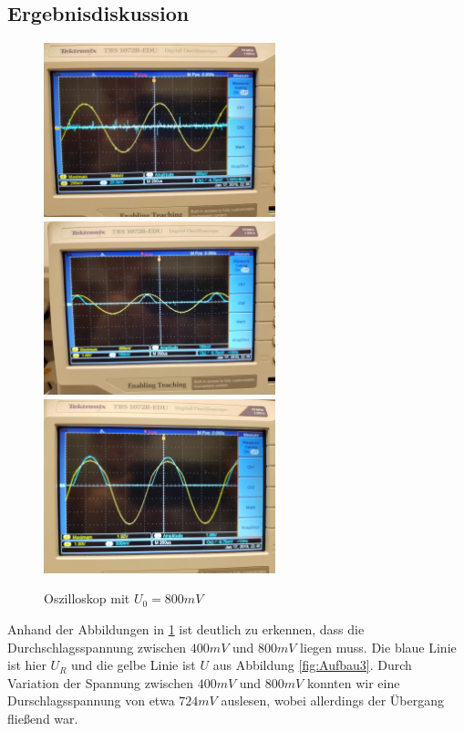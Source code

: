\documentclass{scrartcl}
\begin{document}
\subsection{Ergebnisdiskussion}
\begin{figure}[H]
  \centering
  	\includegraphics[width=0.6\textwidth]{3_400.jpg}
    \includegraphics[width=0.6\textwidth]{3_800.jpg}
    \includegraphics[width=0.6\textwidth]{3_2000.jpg}
  \caption{Oszilloskop mit $U_0 = 800mV$}
  \label{fig:800mv}
\end{figure}
Anhand der Abbildungen in \ref{fig:800mv} ist deutlich zu erkennen, dass die Durchschlagsspannung zwischen $400mV$ und $800mV$ liegen muss. Die blaue Linie ist hier $U_R$ und die gelbe Linie ist $U$ aus Abbildung \ref{fig:Aufbau3}. 
Durch Variation der Spannung zwischen $400mV$ und $800mV$ konnten wir eine Durschlagsspannung von etwa $724mV$ auslesen, wobei allerdings der Übergang fließend war.
\end{document}
